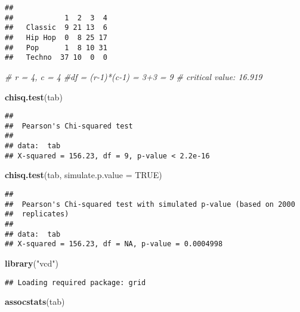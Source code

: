 \documentclass[
]{article}
\newenvironment{Shaded}{\begin{snugshade}}{\end{snugshade}}
\newcommand{\CommentTok}[1]{\textcolor[rgb]{0.56,0.35,0.01}{\textit{#1}}}
\newcommand{\DataTypeTok}[1]{\textcolor[rgb]{0.13,0.29,0.53}{#1}}
\newcommand{\KeywordTok}[1]{\textcolor[rgb]{0.13,0.29,0.53}{\textbf{#1}}}
\newcommand{\NormalTok}[1]{#1}
\newcommand{\OperatorTok}[1]{\textcolor[rgb]{0.81,0.36,0.00}{\textbf{#1}}}
\newcommand{\OtherTok}[1]{\textcolor[rgb]{0.56,0.35,0.01}{#1}}
\newcommand{\StringTok}[1]{\textcolor[rgb]{0.31,0.60,0.02}{#1}}
\begin{document}
\begin{Shaded}
\end{Shaded}

\begin{verbatim}
##          
##            1  2  3  4
##   Classic  9 21 13  6
##   Hip Hop  0  8 25 17
##   Pop      1  8 10 31
##   Techno  37 10  0  0
\end{verbatim}

\begin{Shaded}
\begin{Highlighting}[]
\CommentTok{# r = 4, c = 4}
\CommentTok{#df = (r-1)*(c-1) = 3+3 = 9}
\CommentTok{# critical value: 16.919}


\KeywordTok{chisq.test}\NormalTok{(tab)}
\end{Highlighting}
\end{Shaded}

\begin{verbatim}
## 
##  Pearson's Chi-squared test
## 
## data:  tab
## X-squared = 156.23, df = 9, p-value < 2.2e-16
\end{verbatim}

\begin{Shaded}
\begin{Highlighting}[]
\KeywordTok{chisq.test}\NormalTok{(tab, }\DataTypeTok{simulate.p.value =} \OtherTok{TRUE}\NormalTok{)}
\end{Highlighting}
\end{Shaded}

\begin{verbatim}
## 
##  Pearson's Chi-squared test with simulated p-value (based on 2000
##  replicates)
## 
## data:  tab
## X-squared = 156.23, df = NA, p-value = 0.0004998
\end{verbatim}

\begin{Shaded}
\begin{Highlighting}[]
\KeywordTok{library}\NormalTok{(}\StringTok{"vcd"}\NormalTok{)}
\end{Highlighting}
\end{Shaded}

\begin{verbatim}
## Loading required package: grid
\end{verbatim}

\begin{Shaded}
\begin{Highlighting}[]
\KeywordTok{assocstats}\NormalTok{(tab)}
\end{Highlighting}
\end{Shaded}
\end{document}
